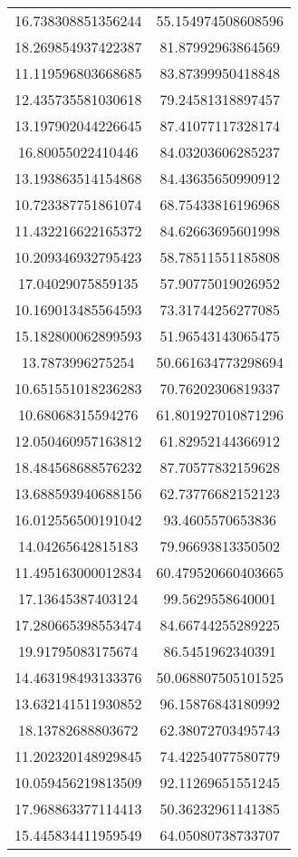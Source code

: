 \begin{table}
\begin{tabular}{cc}
16.738308851356244 & 55.154974508608596 \\
18.269854937422387 & 81.87992963864569 \\
11.119596803668685 & 83.87399950418848 \\
12.435735581030618 & 79.24581318897457 \\
13.197902044226645 & 87.41077117328174 \\
16.80055022410446 & 84.03203606285237 \\
13.193863514154868 & 84.43635650990912 \\
10.723387751861074 & 68.75433816196968 \\
11.432216622165372 & 84.62663695601998 \\
10.209346932795423 & 58.78511551185808 \\
17.04029075859135 & 57.90775019026952 \\
10.169013485564593 & 73.31744256277085 \\
15.182800062899593 & 51.96543143065475 \\
13.7873996275254 & 50.661634773298694 \\
10.651551018236283 & 70.76202306819337 \\
10.68068315594276 & 61.801927010871296 \\
12.050460957163812 & 61.82952144366912 \\
18.484568688576232 & 87.70577832159628 \\
13.688593940688156 & 62.73776682152123 \\
16.012556500191042 & 93.4605570653836 \\
14.04265642815183 & 79.96693813350502 \\
11.495163000012834 & 60.479520660403665 \\
17.13645387403124 & 99.5629558640001 \\
17.280665398553474 & 84.66744255289225 \\
19.91795083175674 & 86.5451962340391 \\
14.463198493133376 & 50.068807505101525 \\
13.632141511930852 & 96.15876843180992 \\
18.13782688803672 & 62.38072703495743 \\
11.202320148929845 & 74.42254077580779 \\
10.059456219813509 & 92.11269651551245 \\
17.968863377114413 & 50.36232961141385 \\
15.445834411959549 & 64.05080738733707 \\

\end{tabular}
\end{table}
